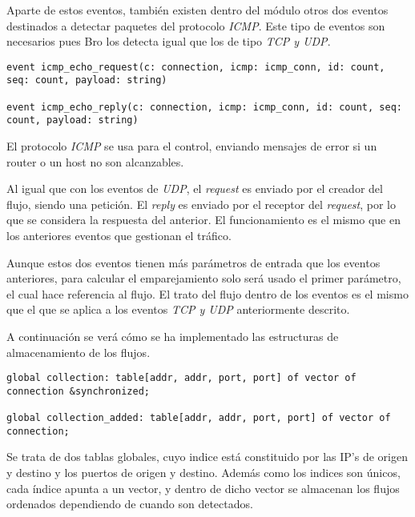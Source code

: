 \intro Aparte de estos eventos, también existen dentro del módulo otros dos eventos destinados a detectar 
paquetes del protocolo \textit{ICMP}. Este tipo de eventos son necesarios pues Bro los detecta igual que los 
de tipo \textit{TCP y UDP}.

\begin{lstlisting}[style=CodigoC]
event icmp_echo_request(c: connection, icmp: icmp_conn, id: count, seq: count, payload: string)

event icmp_echo_reply(c: connection, icmp: icmp_conn, id: count, seq: count, payload: string)
\end{lstlisting}

\intro El protocolo \textit{ICMP} se usa para el control, enviando mensajes de error si un router o un host 
no son alcanzables.

\intro Al igual que con los eventos de \textit{UDP}, el \textit{request} es enviado por el creador del flujo, 
siendo una petición. El \textit{reply} es enviado por el receptor del \textit{request}, por lo que se considera 
la respuesta del anterior. El funcionamiento es el mismo que en los anteriores eventos que gestionan el tráfico.

\intro Aunque estos dos eventos tienen más parámetros de entrada que los eventos anteriores, para calcular el 
emparejamiento solo será usado el primer parámetro, el cual hace referencia al flujo. El trato del flujo dentro 
de los eventos es el mismo que el que se aplica a los eventos \textit{TCP y UDP} anteriormente descrito.

\intro A continuación se verá cómo se ha implementado las estructuras de almacenamiento de los flujos.

\begin{lstlisting}[style=CodigoC]
global collection: table[addr, addr, port, port] of vector of connection &synchronized;

global collection_added: table[addr, addr, port, port] of vector of connection;
\end{lstlisting}

\intro Se trata de dos tablas globales, cuyo indice está constituido por las IP's de origen y destino y los 
puertos de origen y destino. Además como los indices son únicos, cada índice apunta a un vector, y dentro de 
dicho vector se almacenan los flujos ordenados dependiendo de cuando son detectados.


